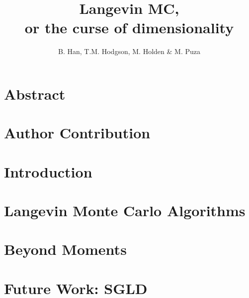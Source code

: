 \documentclass[a4paper, titlepage]{article}
\title{Langevin MC, \\
  \large or the curse of dimensionality}
\author{B. Han, T.M. Hodgson, M. Holden \& M. Puza}
\theoremstyle{definition}
\begin{document}
	\maketitle
	\section*{Abstract}
	\section*{Author Contribution}
	\tableofcontents
	\newpage
	\section{Introduction}
	
	
	\section{Langevin Monte Carlo Algorithms}
	

	\section{Beyond Moments}
	

    \section{Future Work: SGLD}
    
	
	
\end{document}
